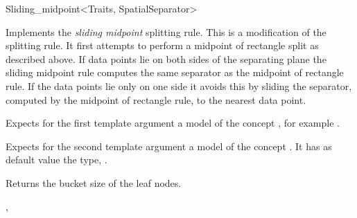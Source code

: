 

\begin{ccRefFunctionObjectClass}{Sliding_midpoint<Traits, SpatialSeparator>}


\ccDefinition
Implements the {\em sliding midpoint} splitting rule.
This is a modification of the  splitting rule.
It first attempts to perform a midpoint of rectangle split as
described above. If data points lie on both sides of the separating
plane the sliding midpoint rule computes the same separator as
the midpoint of rectangle rule. If the data points lie only on one
side it avoids this by sliding the separator, computed by
the midpoint of rectangle rule, to the nearest data point.


\ccParameters

Expects for the first template argument a model of the concept
, for example .

Expects for the second template argument a model of the concept . It has as default value
the type, .


\ccIsModel


\ccCreation
{}  %


\ccOperations

 {Returns the bucket size of the leaf nodes.}


\ccSeeAlso

,\\
\end{ccRefFunctionObjectClass}


